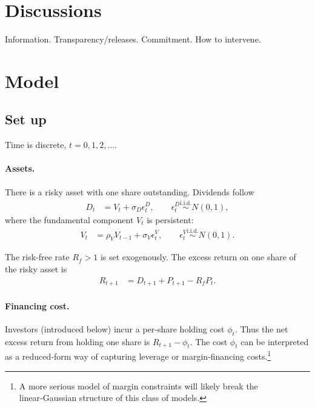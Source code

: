 \documentclass[12pt]{article}
\begin{document}
\thispagestyle{empty}


\setcounter{page}{1}


\newpage
\section{Discussions}

Information. 
Transparency/releases. 
Commitment. 
How to intervene. 

\newpage
\section{Model}

\subsection{Set up}

Time is discrete, \(t = 0,1,2,\dots\).

\paragraph{Assets.}
There is a risky asset with one share outstanding. Dividends follow
\begin{align*}
    D_t & = V_t + \sigma_D \epsilon_t^D, \qquad \epsilon_t^D \stackrel{\text{i.i.d.}}{\sim} N(0,1),
\end{align*}
where the fundamental component \(V_t\) is persistent:
\begin{align*}
    V_t & = \rho_V V_{t-1} + \sigma_V \epsilon_t^V, \qquad \epsilon_t^V \stackrel{\text{i.i.d.}}{\sim} N(0,1).
\end{align*}

The risk‑free rate \(R_f > 1\) is set exogenously. The excess return on one share of the risky asset is
\begin{align}
    R_{t+1} & = D_{t+1} + P_{t+1} - R_f P_t . \label{excess_return}
\end{align}


\paragraph{Financing cost.}
Investors (introduced below) incur a per‑share holding cost \(\phi_t\).  
Thus the net excess return from holding one share is \(R_{t+1} - \phi_t\).  
The cost \(\phi_t\) can be interpreted as a reduced‑form way of capturing leverage or margin‑financing costs.\footnote{A more serious model of margin constraints will likely break the linear‑Gaussian structure of this class of models.}
\end{document}
